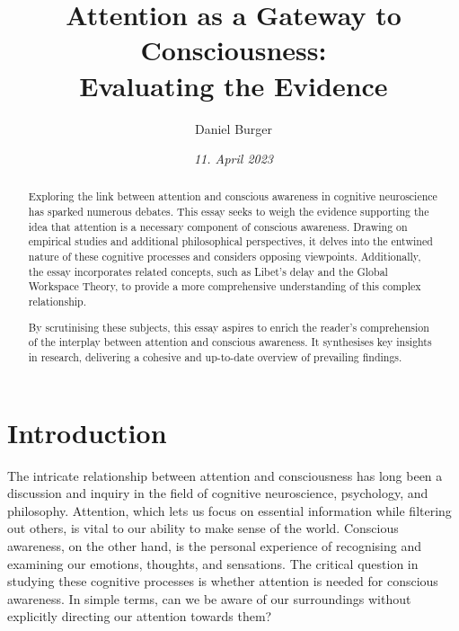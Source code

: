 \documentclass[10pt]{article}
\title{\textbf{Attention as a Gateway to Consciousness:} \\ Evaluating the Evidence}
\author[ ]{Daniel Burger}
\affil[ ]{\textbf{King’s College London}}
\affil[ ]{\href{mailto:public@danielburger.online}{public@danielburger.online}}
\date{\textit{11. April 2023}}
\begin{document}

\maketitle
\thispagestyle{empty}

\begin{sloppypar} %
  \begin{abstract}
    Exploring the link between attention and conscious awareness in cognitive neuroscience has sparked numerous debates. This essay seeks to weigh the evidence supporting the idea that attention is a necessary component of conscious awareness. Drawing on empirical studies and additional philosophical perspectives, it delves into the entwined nature of these cognitive processes and considers opposing viewpoints. Additionally, the essay incorporates related concepts, such as Libet’s delay and the Global Workspace Theory, to provide a more comprehensive understanding of this complex relationship.

    By scrutinising these subjects, this essay aspires to enrich the reader’s comprehension of the interplay between attention and conscious awareness. It synthesises key insights in research, delivering a cohesive and up-to-date overview of prevailing findings.
  \end{abstract}
  \pagebreak

  \tableofcontents
  \pagebreak

  \listoffigures
  \pagebreak

  \listoftables
  \pagebreak


  \doublespacing

  \section{Introduction}
  \label{sec:introduction}

  The intricate relationship between attention and consciousness has long been a discussion and inquiry in the field of cognitive neuroscience, psychology, and philosophy. Attention, which lets us focus on essential information while filtering out others, is vital to our ability to make sense of the world. Conscious awareness, on the other hand, is the personal experience of recognising and examining our emotions, thoughts, and sensations. The critical question in studying these cognitive processes is whether attention is needed for conscious awareness. In simple terms, can we be aware of our surroundings without explicitly directing our attention towards them?


\end{sloppypar}
\end{document}
